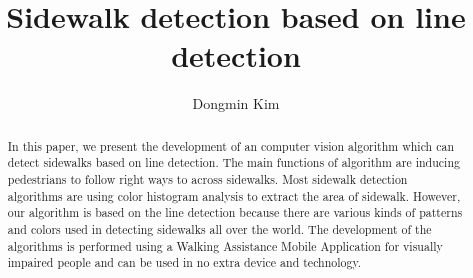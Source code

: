 \documentclass[a4class]{article}
\title{Sidewalk detection based on line detection}
\author{Dongmin Kim}
\begin{document}
\maketitle
\begin{abstract}
In this paper, we present the development of an computer vision algorithm which can detect sidewalks based on line detection. The main functions of algorithm are inducing pedestrians to follow right ways to across sidewalks. Most sidewalk detection algorithms are using color histogram analysis to extract the area of sidewalk. However, our algorithm is based on the line detection because there are various kinds of patterns and colors used in detecting sidewalks all over the world. The development of the algorithms is performed using a Walking Assistance Mobile Application for visually impaired people and can be used in no extra device and technology.
\end{abstract}
\end{document}
